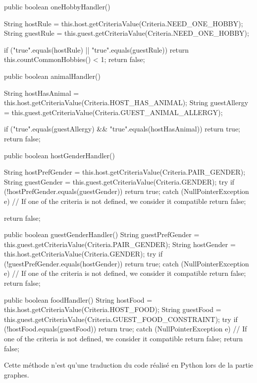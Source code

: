 \documentclass{mytex}
\begin{document}
\begin{codebox}
public boolean oneHobbyHandler() {
	String hostRule = this.host.getCriteriaValue(Criteria.NEED_ONE_HOBBY);
	String guestRule = this.guest.getCriteriaValue(Criteria.NEED_ONE_HOBBY);    
	
	if ("true".equals(hostRule) || "true".equals(guestRule)) {
		return this.countCommonHobbies() < 1;
	}
	return false;
}

public boolean animalHandler() {
	String hostHasAnimal = this.host.getCriteriaValue(Criteria.HOST_HAS_ANIMAL);
	String guestAllergy = this.guest.getCriteriaValue(Criteria.GUEST_ANIMAL_ALLERGY);
	
	if ("true".equals(guestAllergy) && "true".equals(hostHasAnimal)) {
		return true;
	}
	return false;
}

public boolean hostGenderHandler() {
	String hostPrefGender = this.host.getCriteriaValue(Criteria.PAIR_GENDER);
	String guestGender = this.guest.getCriteriaValue(Criteria.GENDER);
	try {
		if (!hostPrefGender.equals(guestGender)) {
			return true;
		}
	} catch (NullPointerException e) {
		// If one of the criteria is not defined, we consider it compatible
		return false;
	}
	
	return false;
}
\end{codebox}

\begin{codebox}
public boolean guestGenderHandler() {
	String guestPrefGender = this.guest.getCriteriaValue(Criteria.PAIR_GENDER);
	String hostGender = this.host.getCriteriaValue(Criteria.GENDER);
	try {
		if (!guestPrefGender.equals(hostGender)) {
			return true;
		}
	} catch (NullPointerException e) {
		// If one of the criteria is not defined, we consider it compatible
		return false;
	}
	return false;
}

public boolean foodHandler() {
	String hostFood = this.host.getCriteriaValue(Criteria.HOST_FOOD);
	String guestFood = this.guest.getCriteriaValue(Criteria.GUEST_FOOD_CONSTRAINT);
	try {
		if (!hostFood.equals(guestFood)) {
			return true;
		}
	} catch (NullPointerException e) {
		// If one of the criteria is not defined, we consider it compatible
		return false;
	}
	return false;
}
\end{codebox}


Cette méthode n'est qu'une traduction du code réalisé en Python lors de la partie graphes.
\end{document}
